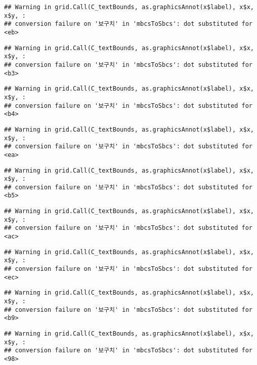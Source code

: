 \documentclass[
]{article}
\begin{document}
\begin{verbatim}
## Warning in grid.Call(C_textBounds, as.graphicsAnnot(x$label), x$x, x$y, :
## conversion failure on '보구치' in 'mbcsToSbcs': dot substituted for <eb>
\end{verbatim}

\begin{verbatim}
## Warning in grid.Call(C_textBounds, as.graphicsAnnot(x$label), x$x, x$y, :
## conversion failure on '보구치' in 'mbcsToSbcs': dot substituted for <b3>
\end{verbatim}

\begin{verbatim}
## Warning in grid.Call(C_textBounds, as.graphicsAnnot(x$label), x$x, x$y, :
## conversion failure on '보구치' in 'mbcsToSbcs': dot substituted for <b4>
\end{verbatim}

\begin{verbatim}
## Warning in grid.Call(C_textBounds, as.graphicsAnnot(x$label), x$x, x$y, :
## conversion failure on '보구치' in 'mbcsToSbcs': dot substituted for <ea>
\end{verbatim}

\begin{verbatim}
## Warning in grid.Call(C_textBounds, as.graphicsAnnot(x$label), x$x, x$y, :
## conversion failure on '보구치' in 'mbcsToSbcs': dot substituted for <b5>
\end{verbatim}

\begin{verbatim}
## Warning in grid.Call(C_textBounds, as.graphicsAnnot(x$label), x$x, x$y, :
## conversion failure on '보구치' in 'mbcsToSbcs': dot substituted for <ac>
\end{verbatim}

\begin{verbatim}
## Warning in grid.Call(C_textBounds, as.graphicsAnnot(x$label), x$x, x$y, :
## conversion failure on '보구치' in 'mbcsToSbcs': dot substituted for <ec>
\end{verbatim}

\begin{verbatim}
## Warning in grid.Call(C_textBounds, as.graphicsAnnot(x$label), x$x, x$y, :
## conversion failure on '보구치' in 'mbcsToSbcs': dot substituted for <b9>
\end{verbatim}

\begin{verbatim}
## Warning in grid.Call(C_textBounds, as.graphicsAnnot(x$label), x$x, x$y, :
## conversion failure on '보구치' in 'mbcsToSbcs': dot substituted for <98>
\end{verbatim}
\end{document}
